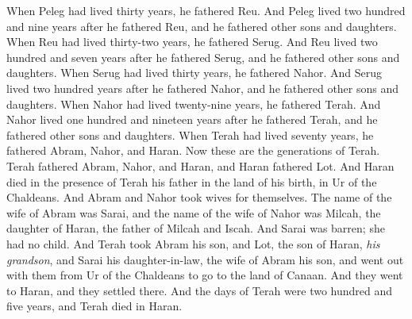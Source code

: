 \begin{biblechapter}
\verse When Peleg had lived thirty years, he fathered Reu.
\verse And Peleg lived two hundred and nine years after he fathered Reu, and he fathered other sons and daughters.
\verse When Reu had lived thirty-two years, he fathered Serug.
\verse And Reu lived two hundred and seven years after he fathered Serug, and he fathered other sons and daughters.
\verse When Serug had lived thirty years, he fathered Nahor.
\verse And Serug lived two hundred years after he fathered Nahor, and he fathered other sons and daughters.
\verse When Nahor had lived twenty-nine years, he fathered Terah.
\verse And Nahor lived one hundred and nineteen years after he fathered Terah, and he fathered other sons and daughters.
\verse When Terah had lived seventy years, he fathered Abram, Nahor, and Haran.
 Now these are the generations of Terah. Terah fathered Abram, Nahor, and Haran, and Haran fathered Lot.
\verse And Haran died in the presence of Terah his father in the land of his birth, in Ur of the Chaldeans.
\verse And Abram and Nahor took wives for themselves. The name of the wife of Abram was Sarai, and the name of the wife of Nahor was Milcah, the daughter of Haran, the father of Milcah and Iscah.
\verse And Sarai was barren; she had no child.
\verse And Terah took Abram his son, and Lot, the son of Haran, \textit{his grandson}, and Sarai his daughter-in-law, the wife of Abram his son, and went out with them from Ur of the Chaldeans to go to the land of Canaan. And they went to Haran, and they settled there.
\verse And the days of Terah were two hundred and five years, and Terah died in Haran.
\end{biblechapter}

